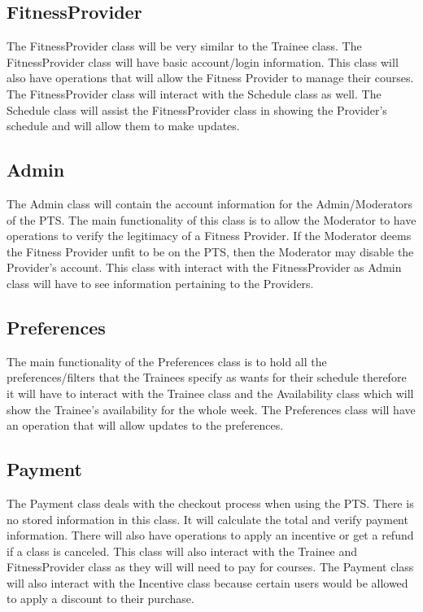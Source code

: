 \documentclass[12pt]{article}
\begin{document}
\subsection{FitnessProvider}
The FitnessProvider class will be very similar to the Trainee class. The FitnessProvider class will have basic account/login information. This class will also have operations that will allow the Fitness Provider to manage their courses. The FitnessProvider class will interact with the Schedule class as well. The Schedule class will assist the FitnessProvider class in showing the Provider’s schedule and will allow them to make updates.

\subsection{Admin}
The Admin class will contain the account information for the Admin/Moderators of the PTS. The main functionality of this class is to allow the Moderator to have operations to verify the legitimacy of a Fitness Provider. If the Moderator deems the Fitness Provider unfit to be on the PTS, then the Moderator may disable the Provider’s account.  This class with interact with the FitnessProvider as Admin class will have to see information pertaining to the Providers. 

\subsection{Preferences}
The main functionality of the Preferences class is to hold all the preferences/filters that the Trainees specify as wants for their schedule therefore it will have to interact with the Trainee class and the Availability class which will show the Trainee’s availability for the whole week. The Preferences class will have an operation that will allow updates to the preferences.

\subsection{Payment}
The Payment class deals with the checkout process when using the PTS. There is no stored information in this class. It will calculate the total and verify payment information. There will also have operations to apply an incentive or get a refund if a class is canceled. This class will also interact with the Trainee and FitnessProvider class as they will will need to pay for courses. The Payment class will also interact with the Incentive class because certain users would be allowed to apply a discount to their purchase.
\end{document}
